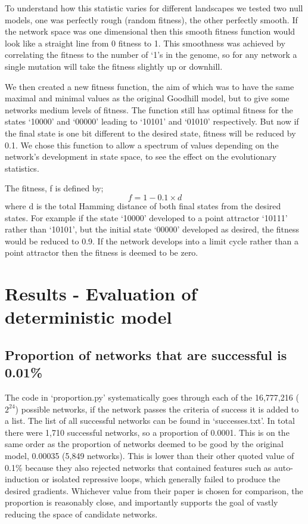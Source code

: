 \documentclass[a4paper,11pt]{article}
\begin{document}
To understand how this statistic varies for different landscapes we tested two null models, one was perfectly rough (random fitness), the other perfectly smooth. If the network space was one dimensional then this smooth fitness function would look like a straight line from 0 fitness to 1. This smoothness was achieved by correlating the fitness to the number of ‘1’s in the genome, so for any network a single mutation will take the fitness slightly up or downhill.\par

We then created a new fitness function, the aim of which was to have the same maximal and minimal values as the original Goodhill model, but to give some networks medium levels of fitness. The function still has optimal fitness for the states `10000' and `00000' leading to `10101' and `01010' respectively. But now if the final state is one bit different to the desired state, fitness will be reduced by 0.1. We chose this function to allow a spectrum of values depending on the network's development in state space, to see the effect on the evolutionary statistics.\par

The fitness, f is defined by;
\begin{equation}
f = 1 - 0.1 \times d
\end{equation}
where d is the total Hamming distance of both final states from the desired states. For example if the state `10000' developed to a point attractor `10111' rather than `10101', but the initial state `00000' developed as desired, the fitness would be reduced to 0.9. If the network develops into a limit cycle rather than a point attractor then the fitness is deemed to be zero.\par




\newpage{}
\section{Results - Evaluation of deterministic model}


\subsection{Proportion of networks that are successful is 0.01\%}
The code in `proportion.py' systematically goes through each of the 16,777,216 ($2^{24}$) possible networks, if the network passes the criteria of success it is added to a list. The list of all successful networks can be found in `successes.txt'. In total there were 1,710 successful networks, so a proportion of 0.0001. This is on the same order as the proportion of networks deemed to be good by the original model, 0.00035 (5,849 networks). This is lower than their other quoted value of 0.1\% because they also rejected networks that contained features such as auto-induction or isolated repressive loops, which generally failed to produce the desired gradients. Whichever value from their paper is chosen for comparison, the proportion is reasonably close, and importantly supports the goal of vastly reducing the space of candidate networks. 
\end{document}
